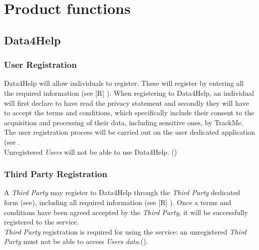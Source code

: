 \documentclass[../../rasd.tex]{subfiles}
\begin{document}
\section{Product functions}
			\subsection{Data4Help}
			
				\subsubsection{User Registration}
				Data4Help will allow individuals to register. These will register by entering all the required information (see [R] ). When registering to Data4Help, an individual will first declare to have read the privacy statement and secondly they will have to accept the terms and conditions, which specifically include their consent to the acquisition and processing of their data, including sensitive ones, by TrackMe.\\
				The user registration process will be carried out on the user dedicated application (see .\\
				Unregistered \textit{Users} will not be able to use Data4Help. ()
			
				\subsubsection{Third Party Registration}
				A \textit{Third Party} may register to Data4Help through the \textit{Third Party} dedicated form (see), including all required information (see [R] ).
				Once a terms and conditions have been agreed accepted by the \textit{Third Party}, it will be successfully registered to the service.\\
				\textit{Third Party} registration is required for using the service: an unregistered \textit{Third Party} must not be able to access \textit{Users data}.().
			
\end{document}
